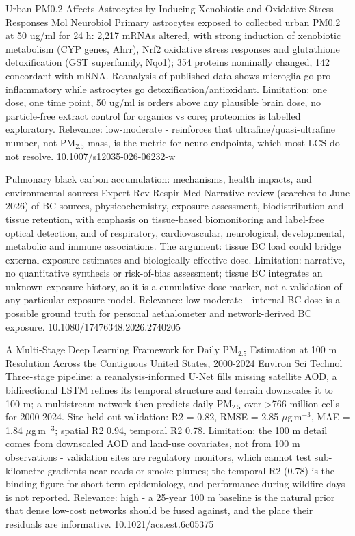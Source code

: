 \documentclass[10pt]{article}
\begin{document}
{Urban PM0.2 Affects Astrocytes by Inducing Xenobiotic and Oxidative Stress Responses}
{Mol Neurobiol}
{Primary astrocytes exposed to collected urban PM0.2 at 50 ug/ml for 24 h: 2,217 mRNAs altered, with strong induction of xenobiotic metabolism (CYP genes, Ahrr), Nrf2 oxidative stress responses and glutathione detoxification (GST superfamily, Nqo1); 354 proteins nominally changed, 142 concordant with mRNA. Reanalysis of published data shows microglia go pro-inflammatory while astrocytes go detoxification/antioxidant. Limitation: one dose, one time point, 50 ug/ml is orders above any plausible brain dose, no particle-free extract control for organics vs core; proteomics is labelled exploratory. Relevance: low-moderate - reinforces that ultrafine/quasi-ultrafine number, not PM$_{2.5}$ mass, is the metric for neuro endpoints, which most LCS do not resolve.}
{10.1007/s12035-026-06232-w}

{Pulmonary black carbon accumulation: mechanisms, health impacts, and environmental sources}
{Expert Rev Respir Med}
{Narrative review (searches to June 2026) of BC sources, physicochemistry, exposure assessment, biodistribution and tissue retention, with emphasis on tissue-based biomonitoring and label-free optical detection, and of respiratory, cardiovascular, neurological, developmental, metabolic and immune associations. The argument: tissue BC load could bridge external exposure estimates and biologically effective dose. Limitation: narrative, no quantitative synthesis or risk-of-bias assessment; tissue BC integrates an unknown exposure history, so it is a cumulative dose marker, not a validation of any particular exposure model. Relevance: low-moderate - internal BC dose is a possible ground truth for personal aethalometer and network-derived BC exposure.}
{10.1080/17476348.2026.2740205}

\par{}\baselineskip{}\baselineskip
{}

{A Multi-Stage Deep Learning Framework for Daily PM$_{2.5}$ Estimation at 100 m Resolution Across the Contiguous United States, 2000-2024}
{Environ Sci Technol}
{Three-stage pipeline: a reanalysis-informed U-Net fills missing satellite AOD, a bidirectional LSTM refines its temporal structure and terrain downscales it to 100 m; a multistream network then predicts daily PM$_{2.5}$ over >766 million cells for 2000-2024. Site-held-out validation: R2 = 0.82, RMSE = 2.85 $\mu$g\,m$^{-3}$, MAE = 1.84 $\mu$g\,m$^{-3}$; spatial R2 0.94, temporal R2 0.78. Limitation: the 100 m detail comes from downscaled AOD and land-use covariates, not from 100 m observations - validation sites are regulatory monitors, which cannot test sub-kilometre gradients near roads or smoke plumes; the temporal R2 (0.78) is the binding figure for short-term epidemiology, and performance during wildfire days is not reported. Relevance: high - a 25-year 100 m baseline is the natural prior that dense low-cost networks should be fused against, and the place their residuals are informative.}
{10.1021/acs.est.6c05375}
\end{document}
